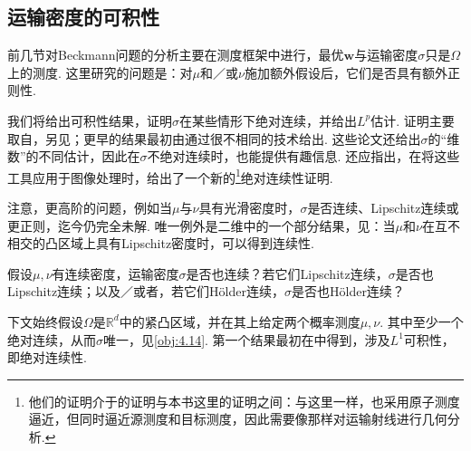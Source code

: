 \subsection{运输密度的可积性}\label{sec:4.3}
\setcounter{theorem}{15}\setcounter{equation}{10}\setcounter{figure}{1}\setcounter{footnote}{3}
前几节对Beckmann问题的分析主要在测度框架中进行，最优$\mathbf w$与运输密度$\sigma$只是$\Omega$上的测度. 这里研究的问题是：对$\mu$和／或$\nu$施加额外假设后，它们是否具有额外正则性.

我们将给出可积性结果，证明$\sigma$在某些情形下绝对连续，并给出$L^p$估计. 证明主要取自\cite{b273}，另见\cite{b61,b166}；更早的结果最初由\cite{b143,b144,b145}通过很不相同的技术给出. 这些论文还给出$\sigma$的“维数”的不同估计，因此在$\sigma$不绝对连续时，也能提供有趣信息. \label{idx:root4-p144-image-processing}还应指出，\cite{b208}在将这些工具应用于图像处理时，给出了一个新的\footnote{他们的证明介于\cite{b143}的证明与本书这里的证明之间：与这里一样，\cite{b208}也采用原子测度逼近，但同时逼近源测度和目标测度，因此需要像\cite{b143}那样对运输射线进行几何分析.}绝对连续性证明.

注意，更高阶的问题，例如当$\mu$与$\nu$具有光滑密度时，$\sigma$是否连续、Lipschitz连续或更正则，迄今仍完全未解. 唯一例外是二维中的一个部分结果，见\cite{b171}：当$\mu$和$\nu$在互不相交的凸区域上具有Lipschitz密度时，可以得到连续性.

\begin{openproblem}[运输密度的连续性]
假设$\mu,\nu$有连续密度，运输密度$\sigma$是否也连续？若它们Lipschitz连续，$\sigma$是否也Lipschitz连续；以及／或者，若它们Hölder连续，$\sigma$是否也Hölder连续？
\end{openproblem}
下文始终假设$\Omega$是$\mathbb R^d$中的紧凸区域，并在其上给定两个概率测度$\mu,\nu$. 其中至少一个绝对连续，从而$\sigma$唯一，见\autoref{obj:4.14}. 第一个结果最初在\cite{b162}中得到，涉及$L^1$可积性，即绝对连续性.

